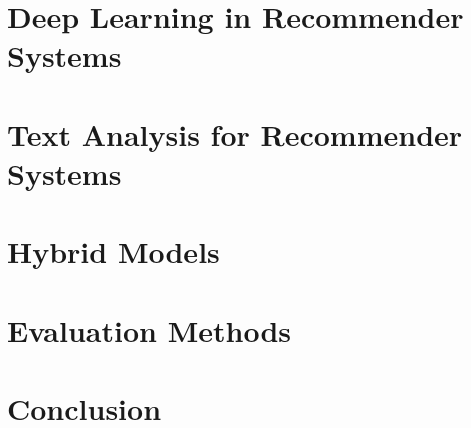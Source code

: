 \section{Deep Learning in Recommender Systems}



\section{Text Analysis for Recommender Systems}



\section{Hybrid Models}



\section{Evaluation Methods}



\section{Conclusion}

